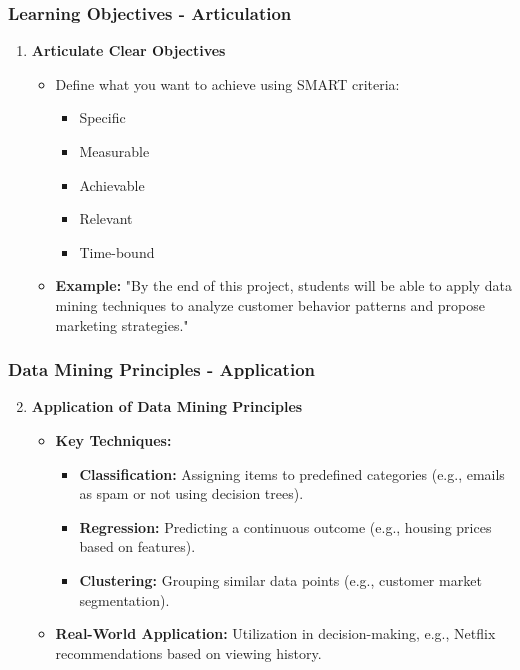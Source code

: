 \documentclass[aspectratio=169]{beamer}
\begin{document}
\begin{frame}[fragile]
    \frametitle{Learning Objectives - Articulation}
    \begin{enumerate}
        \item \textbf{Articulate Clear Objectives}
            \begin{itemize}
                \item Define what you want to achieve using SMART criteria:
                \begin{itemize}
                    \item Specific
                    \item Measurable
                    \item Achievable
                    \item Relevant
                    \item Time-bound
                \end{itemize}
                \item \textbf{Example:} "By the end of this project, students will be able to apply data mining techniques to analyze customer behavior patterns and propose marketing strategies."
            \end{itemize}
    \end{enumerate}
\end{frame}

\begin{frame}[fragile]
    \frametitle{Data Mining Principles - Application}
    \begin{enumerate}
        \setcounter{enumi}{1}
        \item \textbf{Application of Data Mining Principles}
            \begin{itemize}
                \item \textbf{Key Techniques:}
                    \begin{itemize}
                        \item \textbf{Classification:} Assigning items to predefined categories (e.g., emails as spam or not using decision trees).
                        \item \textbf{Regression:} Predicting a continuous outcome (e.g., housing prices based on features).
                        \item \textbf{Clustering:} Grouping similar data points (e.g., customer market segmentation).
                    \end{itemize}
                \item \textbf{Real-World Application:} Utilization in decision-making, e.g., Netflix recommendations based on viewing history.
            \end{itemize}
    \end{enumerate}
\end{frame}
\end{document}
